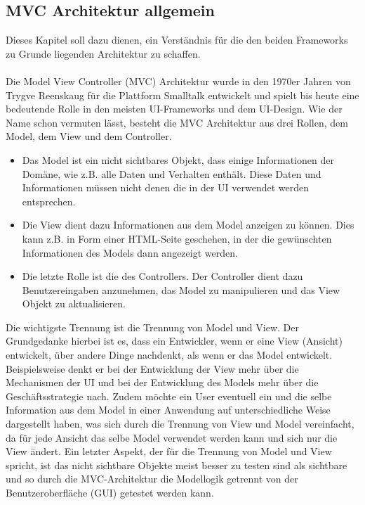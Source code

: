 \subsection{MVC Architektur allgemein}
Dieses Kapitel soll dazu dienen, ein Verständnis für die den beiden Frameworks zu Grunde liegenden Architektur zu schaffen.\\\\
Die Model View Controller (MVC) Architektur wurde in den 1970er Jahren von Trygve Reenskaug für die Plattform Smalltalk entwickelt und spielt bis heute eine bedeutende Rolle in den meisten UI-Frameworks und dem UI-Design\citep[S. 321ff Kapitel 14]{PEAA2002}.
Wie der Name schon vermuten lässt, besteht die MVC Architektur aus drei Rollen, dem Model, dem View und dem Controller.
\begin{itemize}
\item Das Model ist ein nicht sichtbares Objekt, dass einige Informationen der Domäne, wie z.B. alle Daten und Verhalten enthält. Diese Daten und Informationen müssen nicht denen die in der UI verwendet werden entsprechen\citep[S. 321ff Kapitel 14]{PEAA2002}.

\item Die View dient dazu Informationen aus dem Model anzeigen zu können. Dies kann z.B. in Form einer HTML-Seite geschehen, in der die gewünschten Informationen des Models dann angezeigt werden\citep[S. 321ff Kapitel 14]{PEAA2002}.

\item Die letzte Rolle ist die des Controllers. Der Controller dient dazu Benutzereingaben anzunehmen, das Model zu manipulieren und das View Objekt zu aktualisieren\citep[S. 321ff Kapitel 14]{PEAA2002}.
\end{itemize}
Die wichtigste Trennung ist die Trennung von Model und View. Der Grundgedanke hierbei ist es, dass ein Entwickler, wenn er eine View (Ansicht) entwickelt, über andere Dinge nachdenkt, als wenn er das Model entwickelt. Beispielsweise denkt er bei der Entwicklung der View mehr über die Mechanismen der UI und bei der Entwicklung des Models mehr über die Geschäftsstrategie nach. Zudem möchte ein User eventuell ein und die selbe Information aus dem Model in einer Anwendung auf unterschiedliche Weise dargestellt haben, was sich durch die Trennung von View und Model vereinfacht, da für jede Ansicht das selbe Model verwendet werden kann und sich nur die View ändert. Ein letzter Aspekt, der für die Trennung von Model und View spricht, ist das nicht sichtbare Objekte meist besser zu testen sind als sichtbare und so durch die MVC-Architektur die Modellogik getrennt von der Benutzeroberfläche (GUI) getestet werden kann.

